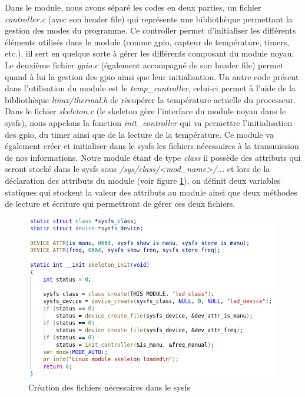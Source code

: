 \documentclass{ReportTemplate}
\begin{document}
Dans le module, nous avons séparé les codes en deux parties, un fichier
\textit{controller.c} (avec son header file) qui représente une bibliothèque
permettant la gestion des modes du programme. Ce controller permet d'initialiser
les différents éléments utilisés dans le module (comme gpio, capteur de
température, timers, etc.), iil sert en quelque sorte à gérer les différents
composant du module noyau.\newline
Le deuxième fichier \textit{gpio.c} (également accompagné de son header file) permet quand à lui la gestion
des gpio ainsi que leur initialisation.\newline
Un autre code présent dans l'utilisation du module est le
\textit{temp\_controller}, celui-ci permet à l'aide de la bibliothèque
\textit{linux/thermal.h} de récupérer la température actuelle du
processeur.\newline
Dans le fichier \textit{skeleton.c} (le skeleton gère l'interface du module
noyau dans le sysfs), nous
appelons la fonction \textit{init\_controller} qui va permettre l'initialisation
des gpio, du timer ainsi que de la lecture de la température.\newline
Ce module va également créer et initialiser dans le sysfs les fichiers
nécessaires à la transmission de nos informations.\newline
Notre module étant de type \textit{class} il possède des attributs qui seront
stocké dans le sysfs sous \textit{/sys/class/<mod\_name>/...} et lors de la
déclaration des attributs du module (voir figure \ref{fig:sysfsInit}), on
définit deux variables statiques qui stockent la valeur des attributs au module ainsi que deux méthodes de lecture et
écriture qui permettront de gérer ces deux fichiers.
\begin{figure}[H]
    \includegraphics[width= \textwidth]{imageSources/Skeleton_Init.png}
    \caption{Création des fichiers nécessaires dans le sysfs}
    \label{fig:sysfsInit}
\end{figure}
\end{document}
